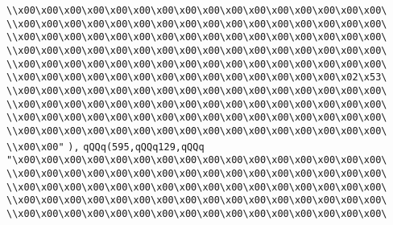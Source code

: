 \verb|\\x00\x00\x00\x00\x00\x00\x00\x00\x00\x00\x00\x00\x00\x00\x00\x00\|\newline
\verb|\\x00\x00\x00\x00\x00\x00\x00\x00\x00\x00\x00\x00\x00\x00\x00\x00\|\newline
\verb|\\x00\x00\x00\x00\x00\x00\x00\x00\x00\x00\x00\x00\x00\x00\x00\x00\|\newline
\verb|\\x00\x00\x00\x00\x00\x00\x00\x00\x00\x00\x00\x00\x00\x00\x00\x00\|\newline
\verb|\\x00\x00\x00\x00\x00\x00\x00\x00\x00\x00\x00\x00\x00\x00\x00\x00\|\newline
\verb|\\x00\x00\x00\x00\x00\x00\x00\x00\x00\x00\x00\x00\x00\x00\x02\x53\|\newline
\verb|\\x00\x00\x00\x00\x00\x00\x00\x00\x00\x00\x00\x00\x00\x00\x00\x00\|\newline
\verb|\\x00\x00\x00\x00\x00\x00\x00\x00\x00\x00\x00\x00\x00\x00\x00\x00\|\newline
\verb|\\x00\x00\x00\x00\x00\x00\x00\x00\x00\x00\x00\x00\x00\x00\x00\x00\|\newline
\verb|\\x00\x00\x00\x00\x00\x00\x00\x00\x00\x00\x00\x00\x00\x00\x00\x00\|\newline
\verb|\\x00\x00"|\newline
\verb|),|\newline
\verb|qQQq(595,qQQq129,qQQq|\newline
\verb|"\x00\x00\x00\x00\x00\x00\x00\x00\x00\x00\x00\x00\x00\x00\x00\x00\|\newline
\verb|\\x00\x00\x00\x00\x00\x00\x00\x00\x00\x00\x00\x00\x00\x00\x00\x00\|\newline
\verb|\\x00\x00\x00\x00\x00\x00\x00\x00\x00\x00\x00\x00\x00\x00\x00\x00\|\newline
\verb|\\x00\x00\x00\x00\x00\x00\x00\x00\x00\x00\x00\x00\x00\x00\x00\x00\|\newline
\verb|\\x00\x00\x00\x00\x00\x00\x00\x00\x00\x00\x00\x00\x00\x00\x00\x00\|\newline
